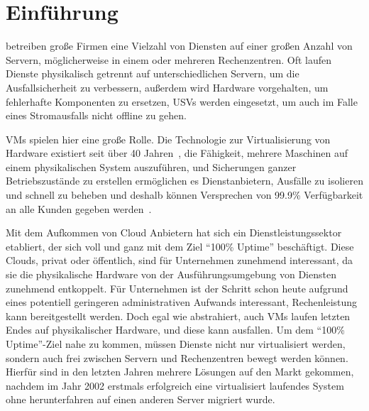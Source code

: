 \section{Einführung}
\label{sec:einfuehrung}
 betreiben große Firmen eine Vielzahl
von Diensten auf einer großen Anzahl von Servern, möglicherweise in
einem oder mehreren Rechenzentren. Oft laufen Dienste physikalisch
getrennt auf unterschiedlichen Servern, um die Ausfallsicherheit zu
verbessern, außerdem wird Hardware vorgehalten, um fehlerhafte
Komponenten zu ersetzen, \acp{USV} werden eingesetzt, um auch im Falle
eines Stromausfalls nicht offline zu gehen.

\acfp{VM} spielen hier eine große Rolle. Die Technologie zur
Virtualisierung von Hardware existiert seit über 40
Jahren~\cite{tanenbaum1992modern}, die Fähigkeit, mehrere Maschinen
auf einem physikalischen System auszuführen, und Sicherungen ganzer
Betriebszustände zu erstellen ermöglichen es Dienstanbietern, Ausfälle
zu isolieren und schnell zu beheben und deshalb können Versprechen von
99.9\% Verfügbarkeit an alle Kunden gegeben
werden~\cite{google-app-sla}.


Mit dem Aufkommen von Cloud Anbietern hat sich ein
Dienstleistungssektor etabliert, der sich voll und ganz mit dem Ziel
"`100\% Uptime"' beschäftigt. Diese Clouds, privat oder öffentlich,
sind für Unternehmen zunehmend interessant, da sie die physikalische
Hardware von der Ausführungsumgebung von Diensten zunehmend
entkoppelt. Für Unternehmen ist der Schritt schon heute aufgrund eines
potentiell geringeren administrativen Aufwands interessant,
Rechenleistung kann bereitgestellt werden. Doch egal wie abstrahiert,
auch \acp{VM} laufen letzten Endes auf physikalischer Hardware, und
diese kann ausfallen. Um dem "`100\% Uptime"'-Ziel nahe zu kommen,
müssen Dienste nicht nur virtualisiert werden, sondern auch frei
zwischen Servern und Rechenzentren bewegt werden können. Hierfür sind
in den letzten Jahren mehrere Lösungen auf den Markt gekommen, nachdem
im Jahr 2002 erstmals erfolgreich eine virtualisiert laufendes System
ohne herunterfahren auf einen anderen Server migriert wurde.






